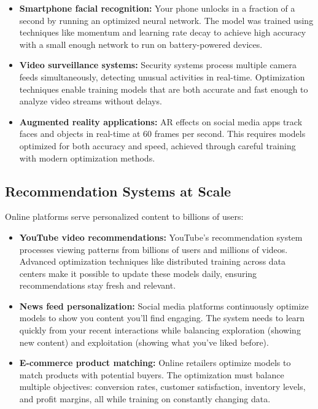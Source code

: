 \begin{itemize}
    \item \textbf{Smartphone facial recognition:} Your phone unlocks in a fraction of a second by running an optimized neural network. The model was trained using techniques like momentum and learning rate decay to achieve high accuracy with a small enough network to run on battery-powered devices.
    
    \item \textbf{Video surveillance systems:} Security systems process multiple camera feeds simultaneously, detecting unusual activities in real-time. Optimization techniques enable training models that are both accurate and fast enough to analyze video streams without delays.
    
    \item \textbf{Augmented reality applications:} AR effects on social media apps track faces and objects in real-time at 60 frames per second. This requires models optimized for both accuracy and speed, achieved through careful training with modern optimization methods.
\end{itemize}

\subsection{Recommendation Systems at Scale}

Online platforms serve personalized content to billions of users:

\begin{itemize}
    \item \textbf{YouTube video recommendations:} YouTube's recommendation system processes viewing patterns from billions of users and millions of videos. Advanced optimization techniques like distributed training across data centers make it possible to update these models daily, ensuring recommendations stay fresh and relevant.
    
    \item \textbf{News feed personalization:} Social media platforms continuously optimize models to show you content you'll find engaging. The system needs to learn quickly from your recent interactions while balancing exploration (showing new content) and exploitation (showing what you've liked before).
    
    \item \textbf{E-commerce product matching:} Online retailers optimize models to match products with potential buyers. The optimization must balance multiple objectives: conversion rates, customer satisfaction, inventory levels, and profit margins, all while training on constantly changing data.
\end{itemize}

